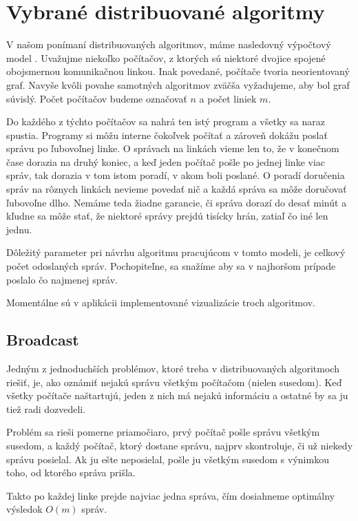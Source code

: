 \section{Vybrané distribuované algoritmy}

V našom ponímaní distribuovaných algoritmov, máme nasledovný výpočtový model \cite{tel2000}.
Uvažujme niekoľko počítačov, z ktorých sú niektoré dvojice spojené obojsmernou komunikačnou linkou.
Inak povedané, počítače tvoria neorientovaný graf. Navyše kvôli povahe samotných algoritmov zväčša vyžadujeme,
aby bol graf súvislý. Počet počítačov budeme označovať $n$ a počet liniek $m$.

Do každého z týchto počítačov sa nahrá ten istý program a všetky sa naraz spustia. Programy si môžu
interne čokoľvek počítať a zároveň dokážu poslať správu po ľubovoľnej linke. O správach na linkách
vieme len to, že v konečnom čase dorazia na druhý koniec, a keď jeden počítač pošle po jednej linke
viac správ, tak dorazia v tom istom poradí, v akom boli poslané. O poradí doručenia správ na rôznych
linkách nevieme povedať nič a každá správa sa môže doručovať ľubovoľne dlho. Nemáme teda žiadne garancie, či
správa dorazí do desať minút a kľudne sa môže stať, že niektoré správy prejdú tisícky hrán, zatiaľ čo
iné len jednu.

Dôležitý parameter pri návrhu algoritmu pracujúcom v tomto modeli, je celkový počet odoslaných
správ. Pochopiteľne, sa snažíme aby sa v najhoršom prípade poslalo čo najmenej
správ.

Momentálne sú v aplikácii implementované vizualizácie troch algoritmov.

\subsection{Broadcast}

Jedným z jednoduchších problémov, ktoré treba v distribuovaných algoritmoch riešiť, je, ako 
oznámiť nejakú správu všetkým počítačom (nielen susedom). Keď všetky počítače naštartujú, 
jeden z nich má nejakú informáciu a ostatné by sa ju tiež radi dozvedeli.

Problém sa rieši pomerne priamočiaro, prvý počítač pošle správu všetkým susedom, a každý
počítač, ktorý dostane správu, najprv skontroluje, či už niekedy správu posielal. 
Ak ju ešte neposielal, pošle ju všetkým susedom s výnimkou toho, od ktorého správa prišla.

Takto po každej linke prejde najviac jedna správa, čím dosiahneme optimálny výsledok $O(m)$ správ.

